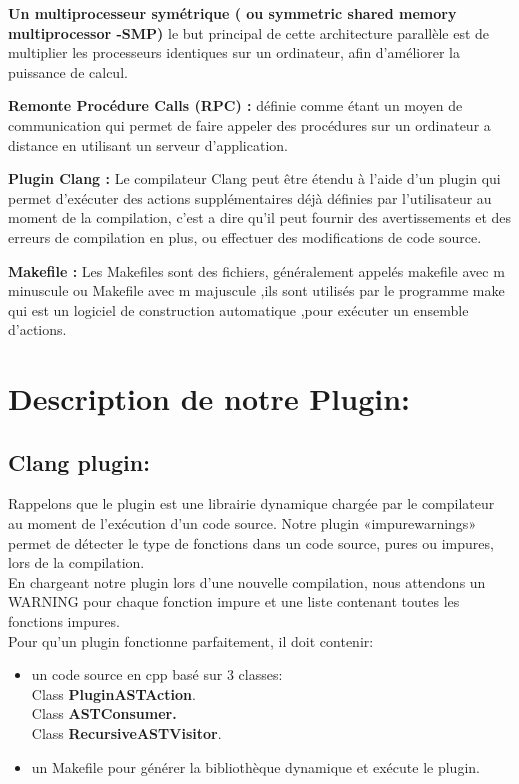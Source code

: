 \documentclass[12pt,titlepage]{article}
\begin{document}
\textbf{ Un multiprocesseur symétrique ( ou symmetric shared memory multiprocessor -SMP) } 
le but principal de cette architecture parallèle  est de multiplier les processeurs identiques sur un ordinateur, afin d’améliorer  la puissance de calcul.\cite{wiki}

\textbf{ Remonte Procédure Calls (RPC) : } définie comme étant un moyen de communication qui permet de faire appeler des procédures sur un ordinateur a distance en utilisant un serveur d'application.\cite{wiki}

\textbf{Plugin Clang :} Le compilateur Clang peut être étendu à l'aide d'un plugin qui permet d'exécuter des actions supplémentaires déjà définies par l'utilisateur au moment de la compilation\cite{ClangTeam}, c'est a dire qu'il peut fournir des avertissements et des erreurs de compilation en plus, ou effectuer des modifications de code source.\cite{clang}

\textbf{Makefile :} Les Makefiles sont des fichiers, généralement appelés makefile avec m minuscule ou Makefile avec m majuscule ,ils sont utilisés par le programme make qui est un logiciel de construction automatique ,pour exécuter un ensemble d'actions.\cite{makefile}
\section{Description de notre Plugin:}

\subsection{Clang plugin:}

Rappelons que le plugin est une librairie dynamique chargée par le compilateur au moment de l’exécution d’un code source.
Notre plugin «impurewarnings»  permet de détecter le type de fonctions dans un code source, pures ou impures, lors de la compilation. \\
En chargeant notre plugin lors d’une nouvelle compilation, nous attendons un WARNING pour chaque fonction impure  et une liste contenant toutes les fonctions impures.\\

Pour qu'un plugin fonctionne parfaitement, il doit contenir: 
\begin{itemize}
    \item un code source en cpp basé sur 3 classes:\\
	 Class \textbf{PluginASTAction}.\\
	 Class  \textbf{ASTConsumer.}\\
	 Class \textbf{RecursiveASTVisitor}.
\item un Makefile  pour générer la bibliothèque dynamique et exécute le plugin.
\end{itemize}
\end{document}
